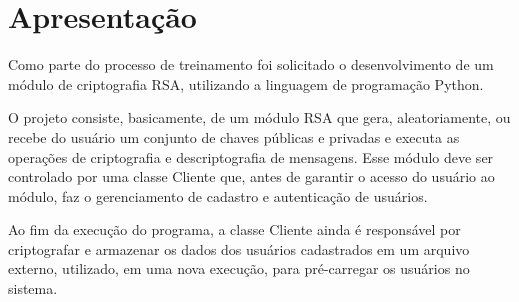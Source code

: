 \documentclass[a4paper, 12pt]{article}
\begin{document}
	
	\tableofcontents
	\newpage
	\section{Apresentação}
		\vspace{0,5 cm}
		\par Como parte do processo de treinamento foi solicitado o desenvolvimento de um módulo de criptografia RSA, utilizando a linguagem de programação Python.
		\\
		\par O projeto consiste, basicamente, de um módulo RSA que gera, aleatoriamente, ou recebe do usuário um conjunto de chaves públicas e privadas e executa as operações de criptografia e descriptografia de mensagens. Esse módulo deve ser controlado por uma classe Cliente que, antes de garantir o acesso do usuário ao módulo, faz o gerenciamento de cadastro e autenticação de usuários.
		\\
		\par Ao fim da execução do programa, a classe Cliente ainda é responsável por criptografar e armazenar os dados dos usuários cadastrados em um arquivo externo, utilizado, em uma nova execução, para pré-carregar os usuários no sistema.
	
	\newpage
\end{document}
